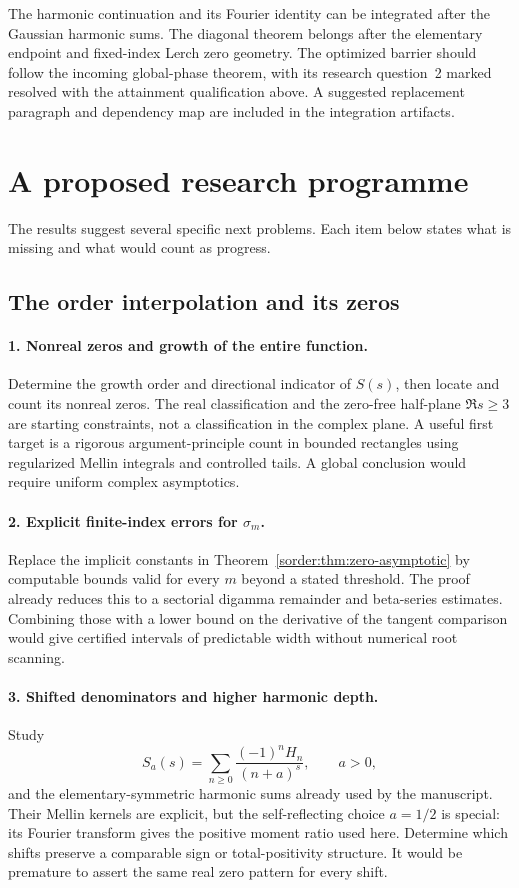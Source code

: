 \documentclass[11pt,a4paper]{article}
\theoremstyle{definition}
\theoremstyle{remark}
\numberwithin{equation}{section}
\begin{document}
The harmonic continuation and its Fourier identity can be integrated
after the Gaussian harmonic sums. The diagonal theorem belongs after
the elementary endpoint and fixed-index Lerch zero geometry. The
optimized barrier should follow the incoming global-phase theorem,
with its research question~2 marked resolved with the attainment
qualification above. A suggested replacement paragraph and dependency
map are included in the integration artifacts.

\section{A proposed research programme}
\label{sec:programme}

The results suggest several specific next problems. Each item below
states what is missing and what would count as progress.

\subsection{The order interpolation and its zeros}

\paragraph{1. Nonreal zeros and growth of the entire function.}
Determine the growth order and directional indicator of $S(s)$, then
locate and count its nonreal zeros. The real classification and the
zero-free half-plane $\Re s\ge3$ are starting constraints, not a
classification in the complex plane. A useful first target is a rigorous
argument-principle count in bounded rectangles using regularized Mellin
integrals and controlled tails. A global conclusion would require
uniform complex asymptotics.

\paragraph{2. Explicit finite-index errors for $\sigma_m$.}
Replace the implicit constants in
Theorem~\ref{sorder:thm:zero-asymptotic} by computable bounds valid for
every $m$ beyond a stated threshold. The proof already reduces this
to a sectorial digamma remainder and beta-series estimates.
Combining those with a lower bound on the derivative of the tangent
comparison would give certified intervals of predictable width
without numerical root scanning.

\paragraph{3. Shifted denominators and higher harmonic depth.}
Study
\[
 S_a(s)=\sum_{n\ge0}\frac{(-1)^nH_n}{(n+a)^s},
 \qquad a>0,
\]
and the elementary-symmetric harmonic sums already used by the
manuscript. Their Mellin kernels are explicit, but the self-reflecting
choice $a=1/2$ is special: its Fourier transform gives the positive
moment ratio used here. Determine which shifts preserve a comparable
sign or total-positivity structure. It would be premature to assert
the same real zero pattern for every shift.
\end{document}
